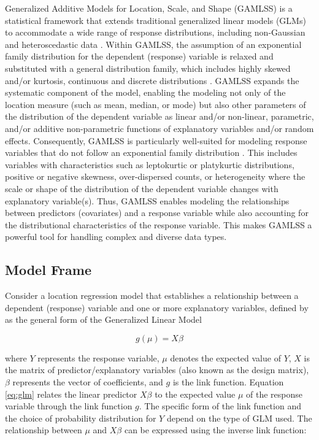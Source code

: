 Generalized Additive Models for Location, Scale, and Shape (GAMLSS) is a statistical framework that extends traditional generalized linear models (GLMs) to accommodate a wide range of response distributions, including non-Gaussian and heteroscedastic data \citep{Rigby2005}. Within GAMLSS, the assumption of an exponential family distribution for the dependent (response) variable is relaxed and substituted with a general distribution family, which includes highly skewed and/or kurtosis, continuous and discrete distributions \citep{Rigby2005, Stasinopoulos2008}. GAMLSS expands the systematic component of the model, enabling the modeling not only of the location measure (such as mean, median, or mode) but also other parameters of the distribution of the dependent variable as linear and/or non-linear, parametric, and/or additive non-parametric functions of explanatory variables and/or random effects. Consequently, GAMLSS is particularly well-suited for modeling response variables that do not follow an exponential family distribution \citep{Stasinopoulos2008, Marmolejo-Ramos2022}. This includes variables with characteristics such as leptokurtic or platykurtic distributions, positive or negative skewness, over-dispersed counts, or heterogeneity where the scale or shape of the distribution of the dependent variable changes with explanatory variable(s). Thus, GAMLSS enables modeling the relationships between predictors (covariates) and a response variable while also accounting for the distributional characteristics of the response variable. This makes GAMLSS a powerful tool for handling complex and diverse data types.

\subsection{Model Frame}\label{model-frame}

Consider a location regression model that establishes a relationship between a dependent (response) variable and one or more explanatory variables, defined by \citet{Nelder1972} as the general form of the Generalized Linear Model

\begin{equation}
g(\mu) = X \beta 
\label{eq:glm}
\end{equation}

where \(Y\) represents the response variable, \(\mu\) denotes the expected value of \(Y\), \(X\) is the matrix of predictor/explanatory variables (also known as the design matrix), \(\beta\) represents the vector of coefficients, and \(g\) is the link function. Equation \eqref{eq:glm} relates the linear predictor \(X \beta\) to the expected value \(\mu\) of the response variable through the link function \(g\). The specific form of the link function and the choice of probability distribution for \(Y\) depend on the type of GLM used. The relationship between \(\mu\) and \(X \beta\) can be expressed using the inverse link function:

